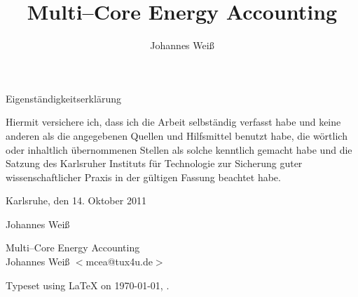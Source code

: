 
\newcommand{\mytitle}{Multi--Core Energy Accounting}

\title{\mytitle{}}
\author{Johannes Weiß}

\maketitle

\vspace*{\fill}

{\Large Eigenst\"andigkeitserkl\"arung}

Hiermit versichere ich, dass ich die Arbeit selbst\"andig verfasst habe und keine
anderen als die angegebenen Quellen und Hilfsmittel benutzt habe, die w\"ortlich
oder inhaltlich \"ubernommenen Stellen als solche kenntlich gemacht habe und die
Satzung des Karlsruher Instituts f\"ur Technologie zur Sicherung guter
wissenschaftlicher Praxis in der g\"ultigen Fassung beachtet habe.

\bigskip{}

Karlsruhe, den 14. Oktober 2011

\bigskip{}

\bigskip{}
Johannes Wei\ss

\vspace*{\fill}

\cleardoublepage

\vspace*{\fill}
\begin{center}
{\Large \mytitle{}} \\
Johannes Wei\ss{} $<$mcea@tux4u.de$>$
\end{center}
\vspace*{\fill}

\newpage
\null
\vfill
\hfill Typeset using \LaTeX{} on \today{}, \currenttime{}.

